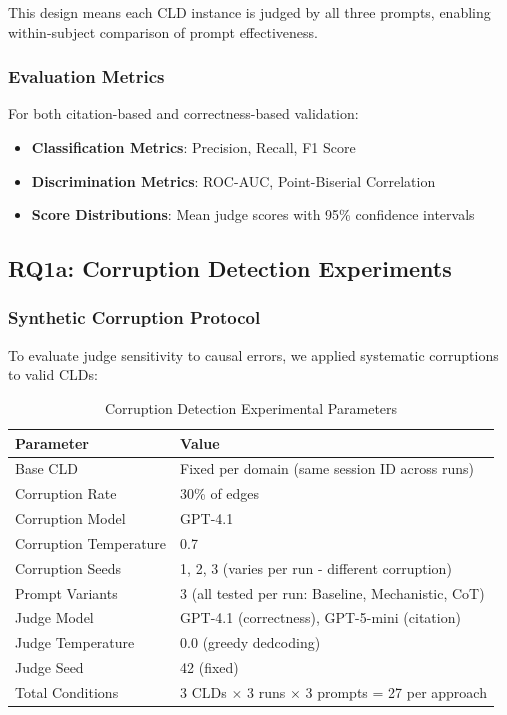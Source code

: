 \documentclass{article}
\begin{document}
This design means each CLD instance is judged by all three prompts, enabling within-subject comparison of prompt effectiveness.

\subsubsection{Evaluation Metrics}

For both citation-based and correctness-based validation:
\begin{itemize}
    \item \textbf{Classification Metrics}: Precision, Recall, F1 Score
    \item \textbf{Discrimination Metrics}: ROC-AUC, Point-Biserial Correlation
    \item \textbf{Score Distributions}: Mean judge scores with 95\% confidence intervals
\end{itemize}

\subsection{RQ1a: Corruption Detection Experiments}

\subsubsection{Synthetic Corruption Protocol}

To evaluate judge sensitivity to causal errors, we applied systematic corruptions to valid CLDs:

\begin{table}[H]
\centering
\caption{Corruption Detection Experimental Parameters}
\label{tab:corruption_params}
\begin{tabular}{ll}
\toprule
\textbf{Parameter} & \textbf{Value} \\
\midrule
Base CLD & Fixed per domain (same session ID across runs) \\
Corruption Rate & 30\% of edges \\
Corruption Model & GPT-4.1 \\
Corruption Temperature & 0.7 \\
Corruption Seeds & 1, 2, 3 (varies per run - different corruption) \\
Prompt Variants & 3 (all tested per run: Baseline, Mechanistic, CoT) \\
Judge Model & GPT-4.1 (correctness), GPT-5-mini (citation) \\
Judge Temperature & 0.0 (greedy dedcoding) \\
Judge Seed & 42 (fixed) \\
\midrule
Total Conditions & 3 CLDs $\times$ 3 runs $\times$ 3 prompts = 27 per approach \\
\bottomrule
\end{tabular}
\end{table}
\end{document}

